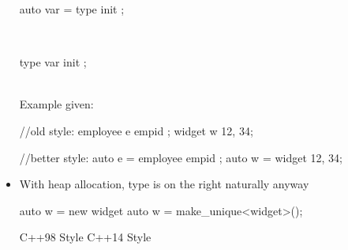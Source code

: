 \begin{itemize}
\begin{minipage}{\MPWxXXSxLISTING\textwidth}
        \begin{CPPCode}
        auto var = type{ init };
\end{CPPCode}
\end{minipage}\\
 \begin{minipage}{\MPWxXXSxLISTING\textwidth} %
{} %
\begin{CPPCode}
        type var{ init };
\end{CPPCode}
    \end{minipage}\\
    Example given:\\
\begin{minipage}{\MPWxXXSxLISTING\textwidth} %
{} %
        \begin{CPPCode}
//old style:
employee e{ empid };
widget w{ 12, 34};
        \end{CPPCode}
    \end{minipage}
    \begin{minipage}{\MPWxXXSxLISTING\textwidth} %
        \begin{CPPCode}
//better style:
auto e = employee{ empid };
auto w = widget{ 12, 34};
        \end{CPPCode}
    \end{minipage}
    
    \item With heap allocation, type is on the right naturally anyway\\
    \begin{minipage}{\MPWxXXSxLISTING\textwidth} %
{} %
        \begin{CPPCode}
auto w = new widget{}           
auto w = make_unique<widget>();
        \end{CPPCode}
    \end{minipage}
    \begin{minipage}{\MPWxXXSxLISTING\textwidth} %
        \begin{CPPCode}
C++98 Style
C++14 Style
        \end{CPPCode}
    \end{minipage}


\end{itemize}
